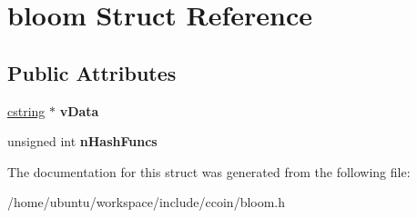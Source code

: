 \hypertarget{structbloom}{\section{bloom Struct Reference}
\label{structbloom}
}
\subsection*{Public Attributes}
\begin{DoxyCompactItemize}
\item 
\hypertarget{structbloom_a910b3bf3cdae4ae041d04d0ce4039f83}{\hyperlink{structcstring}{cstring} $\ast$ {\bfseries v\-Data}}\label{structbloom_a910b3bf3cdae4ae041d04d0ce4039f83}

\item 
\hypertarget{structbloom_ab7b9b4ddbdacaad087cb90157c60efdd}{unsigned int {\bfseries n\-Hash\-Funcs}}\label{structbloom_ab7b9b4ddbdacaad087cb90157c60efdd}

\end{DoxyCompactItemize}


The documentation for this struct was generated from the following file\-:\begin{DoxyCompactItemize}
\item 
/home/ubuntu/workspace/include/ccoin/bloom.\-h\end{DoxyCompactItemize}

